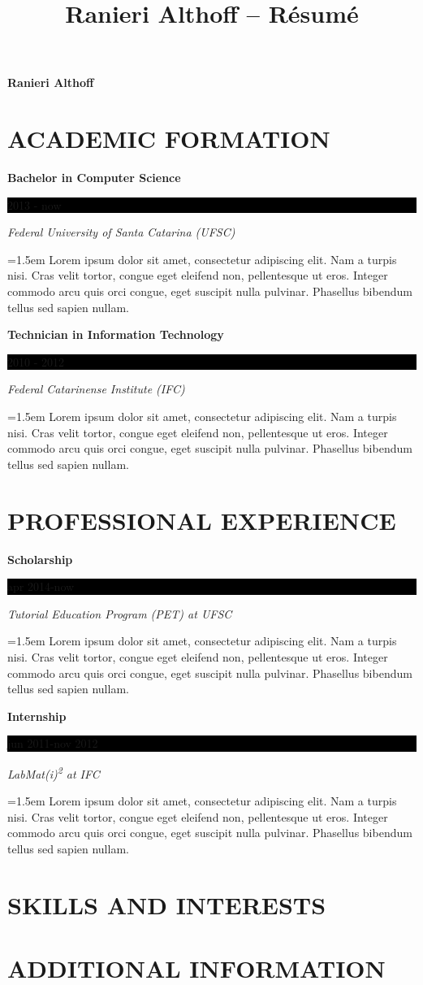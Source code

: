 \documentclass[10pt]{article}
\newcommand{\sectiontitle}[1]{\section*{\uppercase{#1}}}
\newcommand{\formationentry}[4]{
	\noindent \textbf{#1} \hfill
	\colorbox{black}{
		\parbox{8em}{
			\hfill \color{white} #2
		}
	} \par
	\noindent \textit{#3} \par
	\noindent \hangindent=1.5em \hangafter=0 \small #4 \par
	\normalsize
	\vspace{1em}
}
\newcommand{\experienceentry}[4]{
	\noindent \textbf{#1} \hfill
	\colorbox{black}{
		\parbox{8em}{
			\hfill \color{white} #2
		}
	} \par
	\noindent \textit{#3} \par
	\noindent \hangindent=1.5em \hangafter=0 \small #4 \par
	\normalsize
	\vspace{1em}
}
\begin{document}
 \selectfont

\title{Ranieri Althoff -- Résumé}

\Huge \hfill \textbf{Ranieri Althoff}
\normalsize \par

\sectiontitle{Academic Formation}
\formationentry{Bachelor in Computer Science}{2013 - now}{Federal University
of Santa Catarina (UFSC)}{Lorem ipsum dolor sit amet, consectetur adipiscing
elit. Nam a turpis nisi. Cras velit tortor, congue eget eleifend non,
pellentesque ut eros.  Integer commodo arcu quis orci congue, eget suscipit
nulla pulvinar. Phasellus bibendum tellus sed sapien nullam.}

\formationentry{Technician in Information Technology}{2010 - 2012}{Federal
Catarinense Institute (IFC)}{Lorem ipsum dolor sit amet, consectetur adipiscing
elit. Nam a turpis nisi. Cras velit tortor, congue eget eleifend non,
pellentesque ut eros.  Integer commodo arcu quis orci congue, eget suscipit
nulla pulvinar. Phasellus bibendum tellus sed sapien nullam.}


\sectiontitle{Professional Experience}
\experienceentry{Scholarship}{apr 2014-now}{Tutorial Education Program (PET) at
UFSC}{Lorem ipsum dolor sit amet, consectetur adipiscing elit. Nam a turpis
nisi. Cras velit tortor, congue eget eleifend non, pellentesque ut eros.
Integer commodo arcu quis orci congue, eget suscipit nulla pulvinar.
Phasellus bibendum tellus sed sapien nullam.}

\experienceentry{Internship}{jun 2011-nov 2012}{LabMat(i)\textsuperscript{2} at
IFC}{Lorem ipsum dolor sit amet, consectetur adipiscing elit. Nam a turpis
nisi. Cras velit tortor, congue eget eleifend non, pellentesque ut eros.
Integer commodo arcu quis orci congue, eget suscipit nulla pulvinar.
Phasellus bibendum tellus sed sapien nullam.}


\sectiontitle{Skills and Interests}


\sectiontitle{Additional Information}
\end{document}
